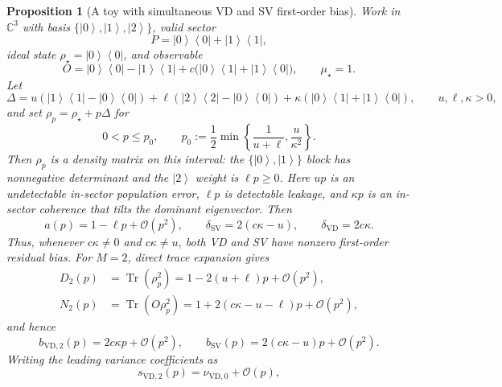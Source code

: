 \documentclass[11pt]{article}
\newtheorem{proposition}{Proposition}
\DeclareMathOperator{\Tr}{Tr}
\newcommand{\1}{\mathbf{1}}
\newcommand{\OO}{\mathcal{O}}
\newcommand{\bra}[1]{\left\langle #1\right|}
\newcommand{\ket}[1]{\left|#1\right\rangle}
\begin{document}
\begin{proposition}[A toy with simultaneous VD and SV first-order bias]
\label{prop:generic_toy_v10}
Work in \(\mathbb C^3\) with basis \(\{\ket0,\ket1,\ket2\}\), valid sector
\begin{equation}
    P=\ket0\bra0+\ket1\bra1,
\end{equation}
ideal state \(\rho_\star=\ket0\bra0\), and observable
\begin{equation}
    O=\ket0\bra0-\ket1\bra1+c\big(\ket0\bra1+\ket1\bra0\big),
    \qquad \mu_\star=1.
\end{equation}
Let
\begin{equation}
    \Delta
    =u(\ket1\bra1-\ket0\bra0)
    +\ell(\ket2\bra2-\ket0\bra0)
    +\kappa(\ket0\bra1+\ket1\bra0),
    \qquad u,\ell,\kappa>0 ,
\end{equation}
and set \(\rho_p=\rho_\star+p\Delta\) for
\begin{equation}
    0<p\leq p_0,
    \qquad
    p_0:=\frac12\min\left\{\frac1{u+\ell},\frac{u}{\kappa^2}\right\}.
    \label{eq:generic_toy_positivity_p0_v13}
\end{equation}
Then \(\rho_p\) is a density matrix on this interval: the \(\{\ket0,\ket1\}\) block has nonnegative determinant and the \(\ket2\) weight is \(\ell p\ge0\).  Here \(up\) is an undetectable in-sector population error, \(\ell p\) is detectable leakage, and \(\kappa p\) is an in-sector coherence that tilts the dominant eigenvector.  Then
\begin{equation}
    a(p)=1-\ell p+\OO(p^2),
    \qquad
    \delta_{\mathrm{SV}}=2(c\kappa-u),
    \qquad
    \delta_{\mathrm{VD}}=2c\kappa.
\end{equation}
Thus, whenever \(c\kappa\ne0\) and \(c\kappa\ne u\), both VD and SV have nonzero first-order residual bias.  For \(M=2\), direct trace expansion gives
\begin{align}
    D_2(p)&=\Tr(\rho_p^2)=1-2(u+\ell)p+\OO(p^2),
    \label{eq:generic_toy_D2_v12}\\
    N_2(p)&=\Tr(O\rho_p^2)=1+2(c\kappa-u-\ell)p+\OO(p^2),
    \label{eq:generic_toy_N2_v12}
\end{align}
and hence
\begin{equation}
    b_{\mathrm{VD},2}(p)=2c\kappa p+\OO(p^2),
    \qquad
    b_{\mathrm{SV}}(p)=2(c\kappa-u)p+\OO(p^2).
    \label{eq:generic_toy_biases_v12}
\end{equation}
Writing the leading variance coefficients as
\begin{equation}
    s_{\mathrm{VD},2}(p)=\nu_{\mathrm{VD},0}+\OO(p),

\end{equation}
\end{proposition}
\end{document}
